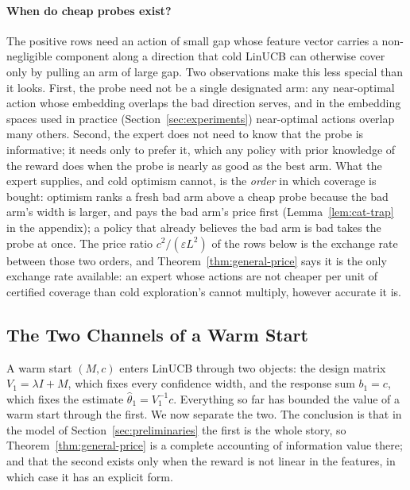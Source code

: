 \documentclass{article}
\theoremstyle{definition}
\theoremstyle{remark}
\newcommand{\eps}{\varepsilon}
\theoremstyle{remark}
\begin{document}
\paragraph{When do cheap probes exist?}
The positive rows need an action of small gap whose feature vector carries a
non-negligible component along a direction that cold LinUCB can otherwise
cover only by pulling an arm of large gap. Two observations make this less
special than it looks. First, the probe need not be a single designated arm:
any near-optimal action whose embedding overlaps the bad direction serves,
and in the embedding spaces used in practice (Section~\ref{sec:experiments})
near-optimal actions overlap many others. Second, the expert does not need to
know that the probe is informative; it needs only to prefer it, which any
policy with prior knowledge of the reward does when the probe is nearly as
good as the best arm. What the expert supplies, and cold optimism cannot, is
the \emph{order} in which coverage is bought: optimism ranks a fresh bad arm
above a cheap probe because the bad arm's width is larger, and pays the bad
arm's price first (Lemma~\ref{lem:cat-trap} in the appendix); a policy that
already believes the bad arm is bad takes the probe at once. The price ratio
$c^2/(\eps L^2)$ of the rows below is the exchange rate between those two
orders, and Theorem~\ref{thm:general-price} says it is the only exchange rate
available: an expert whose actions are not cheaper per unit of certified
coverage than cold exploration's cannot multiply, however accurate it is.

\subsection{The Two Channels of a Warm Start}
\label{sec:two-channels}

A warm start $(M,c)$ enters LinUCB through two objects: the design matrix
$V_1=\lambda I+M$, which fixes every confidence width, and the response sum
$b_1=c$, which fixes the estimate $\widehat\theta_1=V_1^{-1}c$. Everything so
far has bounded the value of a warm start through the first. We now separate
the two. The conclusion is that in the model of
Section~\ref{sec:preliminaries} the first is the whole story, so
Theorem~\ref{thm:general-price} is a complete accounting of information value
there; and that the second exists only when the reward is not linear in the
features, in which case it has an explicit form.
\end{document}
